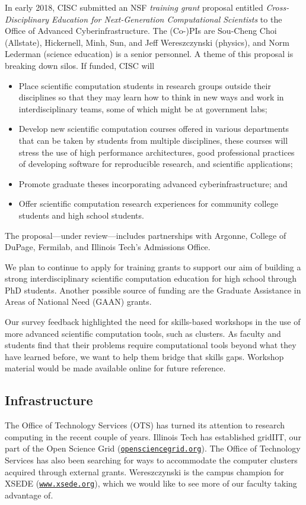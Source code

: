 \documentclass[12pt]{amsart}
\begin{document}
In early 2018, CISC submitted an NSF \emph{training grant} proposal entitled \emph{Cross-Disciplinary Education for Next-Generation Computational Scientists} to the Office of Advanced Cyberinfrastructure. The (Co-)PIs are Sou-Cheng Choi (Allstate), Hickernell, Minh, Sun, and Jeff Wereszczynski (physics), and Norm Lederman (science education) is a senior personnel.  A theme of this proposal is breaking down silos.  If funded, CISC will 
\begin{itemize}
    \item Place scientific computation students in research groups outside their disciplines so that they may learn how to think in new ways and work in interdisciplinary teams, some of which might be at government labs;
    
    \item Develop new scientific computation courses offered in various departments that can be taken by students from multiple disciplines, these courses will stress the use of high performance architectures, good professional practices of developing software for reproducible research, and scientific applications;
    
    \item Promote graduate theses incorporating advanced cyberinfrastructure; and
    
    \item Offer scientific computation research experiences for community college students and high school students.

\end{itemize}
The proposal---under review---includes partnerships with Argonne, College of DuPage, Fermilab, and Illinois Tech's Admissions Office.

We plan to continue to apply for training grants to support our aim of building a strong interdisciplinary scientific computation education for high school through PhD students.  Another possible source of funding are the Graduate Assistance in Areas of National Need (GAAN) grants.

Our survey feedback highlighted the need for skills-based workshops in the use of more advanced scientific computation tools, such as clusters.  As faculty and students find that their problems require computational tools beyond what they have learned before, we want to help them bridge that skills gaps.  Workshop material would be made available online for future reference.

\subsection*{Infrastructure} The Office of Technology Services (OTS) has turned its attention to research computing in the recent couple of years.  Illinois Tech has established gridIIT, our part of the Open Science Grid (\href{http://opensciencegrid.org}{\nolinkurl{opensciencegrid.org}}).  The Office of Technology Services has also been searching for ways to accommodate the computer clusters acquired through external grants.   Wereszczynski is the campus champion for XSEDE (\href{https://www.xsede.org}{\nolinkurl{www.xsede.org}}), which we would like to see more of our faculty taking advantage of.
\end{document}

